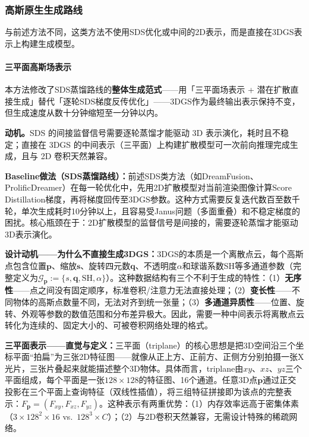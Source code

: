 \subsubsection{高斯原生生成路线}

与前述方法不同，这类方法不使用SDS优化或中间的2D表示，而是直接在3DGS表示上构建生成模型。

\paragraph{三平面高斯场表示}

本方法修改了SDS蒸馏路线的\textbf{整体生成范式}——用「三平面场表示 + 潜在扩散直接生成」替代「逐轮SDS梯度反传优化」——3DGS作为最终输出表示保持不变，但生成速度从数十分钟缩短至一分钟以内。

\textbf{动机。}SDS 的间接监督信号需要逐轮蒸馏才能驱动 3D 表示演化，耗时且不稳定；直接在 3DGS 的中间表示（三平面）上构建扩散模型可一次前向推理完成生成，且与 2D 卷积天然兼容。

\textbf{Baseline做法（SDS蒸馏路线）：}前述SDS类方法（如DreamFusion、ProlificDreamer）在每一轮优化中，先用2D扩散模型对当前渲染图像计算Score Distillation梯度，再将梯度回传至3DGS参数。这种方式需要反复迭代数百至数千轮，单次生成耗时10分钟以上，且容易受Janus问题（多面重叠）和不稳定梯度的困扰。核心瓶颈在于：2D扩散模型的监督信号是间接的，需要逐轮蒸馏才能驱动3D表示演化。

\textbf{设计动机——为什么不直接生成3DGS：}3DGS的本质是一个离散点云，每个高斯点包含位置$\mathbf{p}$、缩放$\mathbf{s}$、旋转四元数$\mathbf{q}$、不透明度$\alpha$和球谐系数SH等多通道参数（完整定义为$\mathcal{G}_{\mathbf{p}}:=\{s, \mathbf{q}, \mathrm{SH}, \alpha\}$）。这种数据结构有三个不利于生成的特性：（1）\textbf{无序性}——点之间没有固定顺序，标准卷积/注意力无法直接处理；（2）\textbf{变长性}——不同物体的高斯点数量不同，无法对齐到统一张量；（3）\textbf{多通道异质性}——位置、旋转、外观等参数的数值范围和分布差异极大。因此，需要一种中间表示将离散点云转化为连续的、固定大小的、可被卷积网络处理的格式。

\textbf{三平面表示——直觉与定义：}三平面（triplane）的核心思想是把3D空间沿三个坐标平面``拍扁''为三张2D特征图——就像从正上方、正前方、正侧方分别拍摄一张X光片，三张片叠起来就能描述整个3D物体。具体而言，triplane由$xy$、$xz$、$yz$三个平面组成，每个平面是一张$128\times 128$的特征图、16个通道。任意3D点$\mathbf{p}$通过正交投影在三个平面上查询特征（双线性插值），将三组特征拼接即为该点的完整表示：$F_{\mathbf{p}}=(F_{xy}, F_{xz}, F_{yz})$。这种表示有两重优势：（1）内存效率远高于密集体素（$3\times 128^2 \times 16$ vs.\ $128^3 \times C$）；（2）与2D卷积天然兼容，无需设计特殊的稀疏网络。

